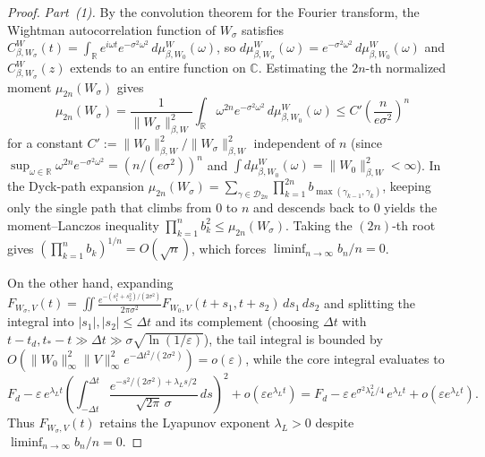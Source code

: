 \documentclass[11pt,a4paper]{article}
\numberwithin{equation}{section}
\theoremstyle{plain}
\theoremstyle{definition}
\begin{document}
\begin{proof}
\emph{Part~(1).} By the convolution theorem for the Fourier transform, the Wightman autocorrelation function of $W_\sigma$ satisfies $C_{\beta,W_\sigma}^W(t) = \int_{\mathbb{R}} e^{i\omega t} e^{-\sigma^2\omega^2}\,d\mu_{\beta,W_0}^W(\omega)$, so $d\mu_{\beta,W_\sigma}^W(\omega) = e^{-\sigma^2\omega^2}\,d\mu_{\beta,W_0}^W(\omega)$ and $C_{\beta,W_\sigma}^W(z)$ extends to an entire function on $\mathbb{C}$. Estimating the $2n$-th normalized moment $\mu_{2n}(W_\sigma)$ gives
\[
  \mu_{2n}(W_\sigma)
  = \frac{1}{\|W_\sigma\|_{\beta,W}^2}\int_{\mathbb{R}} \omega^{2n} e^{-\sigma^2\omega^2}\,d\mu_{\beta,W_0}^W(\omega)
  \le C'\left(\frac{n}{e\sigma^2}\right)^n
\]
for a constant $C' := \|W_0\|_{\beta,W}^2/\|W_\sigma\|_{\beta,W}^2$ independent of $n$ (since $\sup_{\omega\in\mathbb{R}} \omega^{2n} e^{-\sigma^2\omega^2} = (n/(e\sigma^2))^n$ and $\int d\mu_{\beta,W_0}^W(\omega) = \|W_0\|_{\beta,W}^2 < \infty$). In the Dyck-path expansion $\mu_{2n}(W_\sigma) = \sum_{\gamma\in\mathcal{D}_{2n}}\prod_{k=1}^{2n} b_{\max(\gamma_{k-1},\gamma_k)}$, keeping only the single path that climbs from $0$ to $n$ and descends back to $0$ yields the moment--Lanczos inequality $\prod_{k=1}^n b_k^2 \le \mu_{2n}(W_\sigma)$. Taking the $(2n)$-th root gives $(\prod_{k=1}^n b_k)^{1/n} = O(\sqrt{n})$, which forces $\liminf_{n\to\infty} b_n/n = 0$.

On the other hand, expanding $F_{W_\sigma,V}(t) = \iint \frac{e^{-(s_1^2+s_2^2)/(2\sigma^2)}}{2\pi\sigma^2} F_{W_0,V}(t+s_1, t+s_2)\,ds_1\,ds_2$ and splitting the integral into $|s_1|,|s_2| \le \Delta t$ and its complement (choosing $\Delta t$ with $t - t_d, t_* - t \gg \Delta t \gg \sigma\sqrt{\ln(1/\varepsilon)}$), the tail integral is bounded by $O(\|W_0\|_\infty^2\|V\|_\infty^2 e^{-\Delta t^2/(2\sigma^2)}) = o(\varepsilon)$, while the core integral evaluates to
\[
  F_d - \varepsilon\,e^{\lambda_L t}\left(\int_{-\Delta t}^{\Delta t} \frac{e^{-s^2/(2\sigma^2) + \lambda_L s/2}}{\sqrt{2\pi}\,\sigma}\,ds\right)^2 + o(\varepsilon e^{\lambda_L t})
  = F_d - \varepsilon\,e^{\sigma^2\lambda_L^2/4}\,e^{\lambda_L t} + o(\varepsilon e^{\lambda_L t}).
\]
Thus $F_{W_\sigma,V}(t)$ retains the Lyapunov exponent $\lambda_L > 0$ despite $\liminf_{n\to\infty} b_n/n = 0$.


\end{proof}
\end{document}
